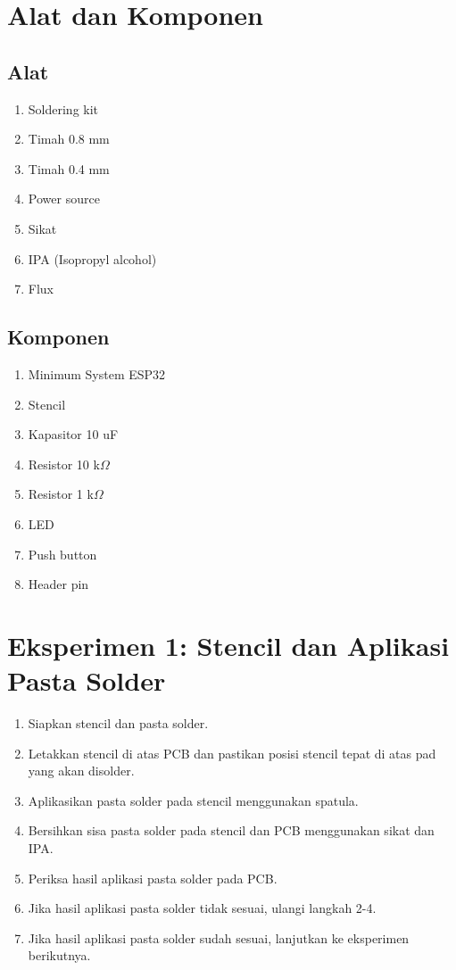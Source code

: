 \section{Alat dan Komponen}
\subsection{Alat}
\begin{enumerate}
    \item Soldering kit
    \item Timah 0.8 mm
    \item Timah 0.4 mm
    \item Power source
    \item Sikat 
    \item IPA (Isopropyl alcohol)
    \item Flux
\end{enumerate}

\subsection{Komponen}
\begin{enumerate}
    \item Minimum System ESP32
    \item Stencil
    \item Kapasitor 10 uF
    \item Resistor 10 k$\Omega$
    \item Resistor 1 k$\Omega$
    \item LED
    \item Push button
    \item Header pin
\end{enumerate}

\section{Eksperimen 1: Stencil dan Aplikasi Pasta Solder}
\begin{enumerate}
    \item Siapkan stencil dan pasta solder.
    \item Letakkan stencil di atas PCB dan pastikan posisi stencil tepat di atas pad yang akan disolder.
    \item Aplikasikan pasta solder pada stencil menggunakan spatula.
    \item Bersihkan sisa pasta solder pada stencil dan PCB menggunakan sikat dan IPA.
    \item Periksa hasil aplikasi pasta solder pada PCB.
    \item Jika hasil aplikasi pasta solder tidak sesuai, ulangi langkah 2-4.
    \item Jika hasil aplikasi pasta solder sudah sesuai, lanjutkan ke eksperimen berikutnya.
\end{enumerate}

